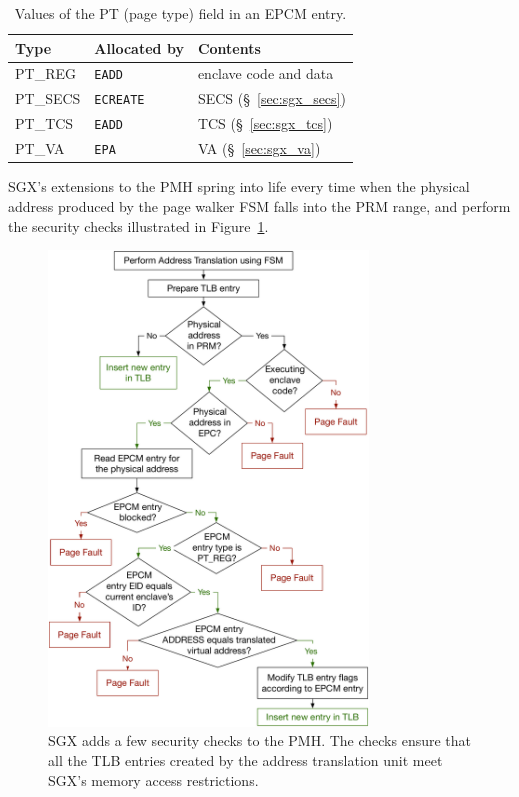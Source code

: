 \begin{table}[hbt]
  \centering
  \begin{tabularx}{\columnwidth}{| l | l | X |}
  \hline
  \textbf{Type} & \textbf{Allocated by} & \textbf{Contents}\\
  \hline
  PT\_REG & \texttt{EADD} & enclave code and data \\
  \hline
  PT\_SECS & \texttt{ECREATE} & SECS (\S~\ref{sec:sgx_secs}) \\
  \hline
  PT\_TCS & \texttt{EADD} & TCS (\S~\ref{sec:sgx_tcs}) \\
  \hline
  PT\_VA & \texttt{EPA} & VA (\S~\ref{sec:sgx_va}) \\
  \hline
  \end{tabularx}
  \caption{Values of the PT (page type) field in an EPCM entry.}
  \label{fig:sgx_pt_values}
\end{table}


SGX's extensions to the PMH spring into life every time when the physical
address produced by the page walker FSM falls into the PRM range, and perform
the security checks illustrated in Figure~\ref{fig:sgx_tlb_miss_checks}.

\begin{figure}[hbt]
  \centering
  \includegraphics[width=85mm]{figures/sgx_tlb_miss_checks.pdf}
  \caption{
    SGX adds a few security checks to the PMH. The checks ensure that all the
    TLB entries created by the address translation unit meet SGX's memory
    access restrictions.
  }
  \label{fig:sgx_tlb_miss_checks}
\end{figure}



